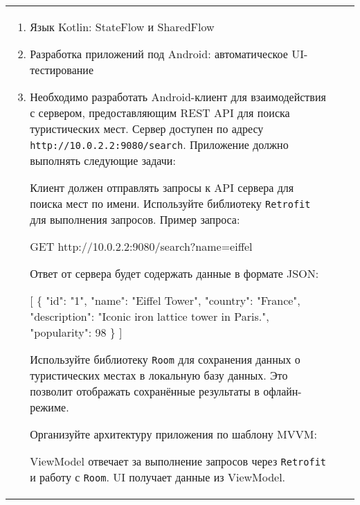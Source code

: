 \documentclass[a4paper]{article}
\begin{document}
\begin{tabular}{!{\vrule width 2pt}p{5cm}|p{6cm}|p{4cm}!{\vrule width 2pt}}
{\begin{minipage}{16cm}
\fontsize{14pt}{16pt}\selectfont\itshape
\begin{enumerate}
    \item Язык Kotlin: StateFlow и SharedFlow
    \item Разработка приложений под Android: автоматическое UI-тестирование
    \item %

Необходимо разработать Android-клиент для взаимодействия с сервером, предоставляющим REST API для поиска туристических мест. Сервер доступен по адресу \texttt{http://10.0.2.2:9080/search}. Приложение должно выполнять следующие задачи:


Клиент должен отправлять запросы к API сервера для поиска мест по имени. Используйте библиотеку \texttt{Retrofit} для выполнения запросов. Пример запроса:

 GET http://10.0.2.2:9080/search?name=eiffel 

Ответ от сервера будет содержать данные в формате JSON:

 [ \{ "id": "1", "name": "Eiffel Tower", 
    "country": "France", 
    "description": "Iconic iron lattice tower in Paris.", 
    "popularity": 98 \} ] 


Используйте библиотеку \texttt{Room} для сохранения данных о туристических местах в локальную базу данных. Это позволит отображать сохранённые результаты в офлайн-режиме.


Организуйте архитектуру приложения по шаблону MVVM:

ViewModel отвечает за выполнение запросов через \texttt{Retrofit} и работу с \texttt{Room}.
UI получает данные из ViewModel.


\end{enumerate}
\end{minipage}}
\end{tabular}
\end{document}
